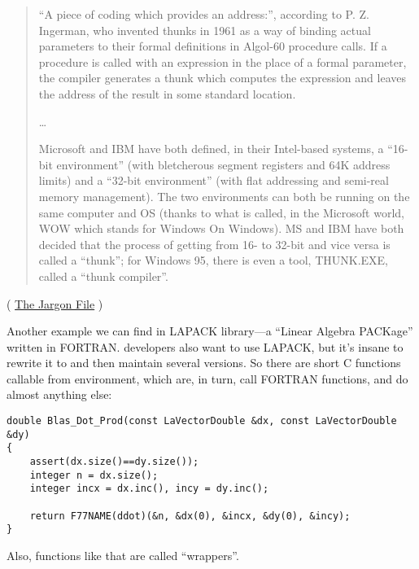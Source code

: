 \begin{framed}
\begin{quotation}
“A piece of coding which provides an address:”, according to P. Z. Ingerman, 
who invented thunks in 1961 as a way of binding actual parameters to their formal 
definitions in Algol-60 procedure calls. If a procedure is called with an expression 
in the place of a formal parameter, the compiler generates a thunk which computes 
the expression and leaves the address of the result in some standard location.

\dots

Microsoft and IBM have both defined, in their Intel-based systems, a “16-bit environment” 
(with bletcherous segment registers and 64K address limits) and a “32-bit environment” 
(with flat addressing and semi-real memory management). The two environments can both be 
running on the same computer and OS (thanks to what is called, in the Microsoft world, 
WOW which stands for Windows On Windows). MS and IBM have both decided that the process 
of getting from 16- to 32-bit and vice versa is called a “thunk”; for Windows 95, 
there is even a tool, THUNK.EXE, called a “thunk compiler”.
\end{quotation}
\end{framed}
( \href{http://www.catb.org/jargon/html/T/thunk.html}{The Jargon File} )

Another example we can find in LAPACK library---a ``Linear Algebra PACKage'' written in FORTRAN.
\CCpp developers also want to use LAPACK, but it's insane to rewrite it to \CCpp and then maintain several versions.
So there are short C functions callable from \CCpp environment, which are, in turn, call FORTRAN functions,
and do almost anything else:

\begin{lstlisting}[style=customc]
double Blas_Dot_Prod(const LaVectorDouble &dx, const LaVectorDouble &dy)
{
    assert(dx.size()==dy.size());
    integer n = dx.size();
    integer incx = dx.inc(), incy = dy.inc();

    return F77NAME(ddot)(&n, &dx(0), &incx, &dy(0), &incy);
}
\end{lstlisting}

Also, functions like that are called ``wrappers''.

